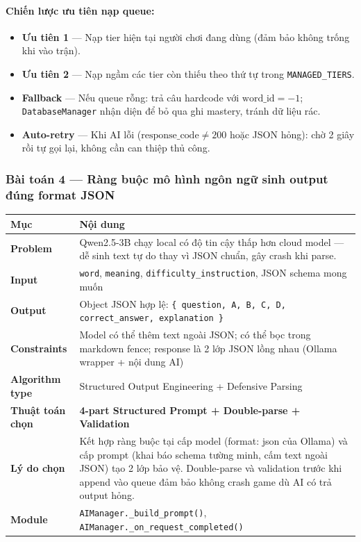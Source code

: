\paragraph{Chiến lược ưu tiên nạp queue:}
\begin{itemize}
    \item \textbf{Ưu tiên 1} — Nạp tier hiện tại người chơi đang dùng (đảm bảo không trống khi vào trận).
    \item \textbf{Ưu tiên 2} — Nạp ngầm các tier còn thiếu theo thứ tự trong \texttt{MANAGED\_TIERS}.
    \item \textbf{Fallback} — Nếu queue rỗng: trả câu hardcode với $\text{word\_id} = -1$; \texttt{DatabaseManager} nhận diện để bỏ qua ghi mastery, tránh dữ liệu rác.
    \item \textbf{Auto-retry} — Khi AI lỗi ($\text{response\_code} \neq 200$ hoặc JSON hỏng): chờ 2 giây rồi tự gọi lại, không cần can thiệp thủ công.
\end{itemize}

\vspace{0.5cm}

\subsubsection{Bài toán 4 — Ràng buộc mô hình ngôn ngữ sinh output đúng format JSON}
\begin{tabularx}{\textwidth}{|l|X|}
\toprule
\textbf{Mục} & \textbf{Nội dung} \\
\midrule
\textbf{Problem} & Qwen2.5-3B chạy local có độ tin cậy thấp hơn cloud model — dễ sinh text tự do thay vì JSON chuẩn, gây crash khi parse. \\
\textbf{Input} & \texttt{word}, \texttt{meaning}, \texttt{difficulty\_instruction}, JSON schema mong muốn \\
\textbf{Output} & Object JSON hợp lệ: \texttt{\{ question, A, B, C, D, correct\_answer, explanation \}} \\
\textbf{Constraints} & Model có thể thêm text ngoài JSON; có thể bọc trong markdown fence; response là 2 lớp JSON lồng nhau (Ollama wrapper + nội dung AI) \\
\textbf{Algorithm type} & Structured Output Engineering + Defensive Parsing \\
\textbf{Thuật toán chọn} & \textbf{4-part Structured Prompt + Double-parse + Validation} \\
\textbf{Lý do chọn} & Kết hợp ràng buộc tại cấp model (format: json của Ollama) và cấp prompt (khai báo schema tường minh, cấm text ngoài JSON) tạo 2 lớp bảo vệ. Double-parse và validation trước khi append vào queue đảm bảo không crash game dù AI có trả output hỏng. \\
\textbf{Module} & \texttt{AIManager.\_build\_prompt()}, \texttt{AIManager.\_on\_request\_completed()} \\
\bottomrule
\end{tabularx}

